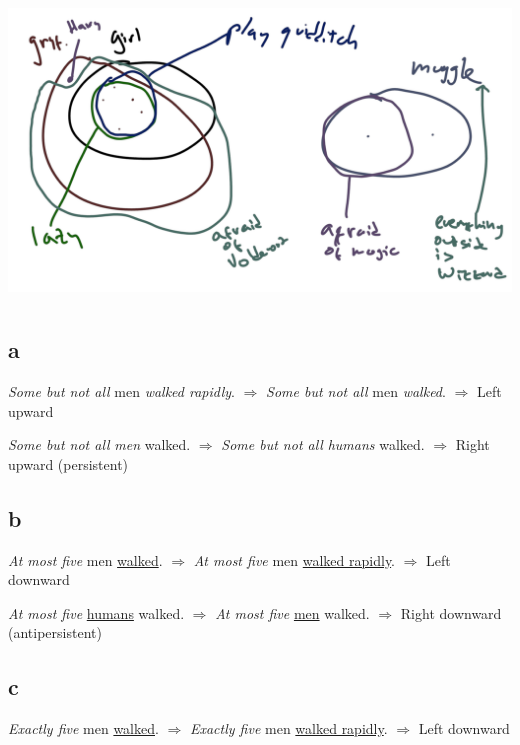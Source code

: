 \documentclass{article}
\begin{document}
\includegraphics[width=\linewidth]{world.png}

\section{}

\subsection*{a}

\text{}

\textit{Some but not all} men \emph{walked rapidly}.
$\Rightarrow$
\textit{Some but not all} men \emph{walked}.
$\Rightarrow$
Left upward

\textit{Some but not all} \emph{men} walked.
$\Rightarrow$
\textit{Some but not all} \emph{humans} walked.
$\Rightarrow$
Right upward (persistent)

\subsection*{b}

\text{}

\textit{At most five} men \underline{walked}.
$\Rightarrow$
\textit{At most five} men \underline{walked rapidly}.
$\Rightarrow$
Left downward

\textit{At most five} \underline{humans} walked.
$\Rightarrow$
\textit{At most five} \underline{men} walked.
$\Rightarrow$
Right downward (antipersistent)

\subsection*{c}

\text{}

\textit{Exactly five} men \underline{walked}.
$\Rightarrow$
\textit{Exactly five} men \underline{walked rapidly}.
$\Rightarrow$
Left downward
\end{document}

